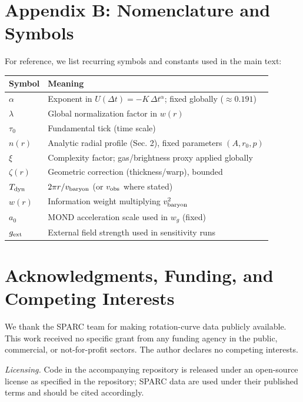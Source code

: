 \documentclass[12pt,a4paper]{article}
\begin{document}
\section*{Appendix B: Nomenclature and Symbols}
\noindent For reference, we list recurring symbols and constants used in the main text:
\begin{center}
\begin{tabular}{ll}
\toprule
Symbol & Meaning \\
\midrule
$\alpha$ & Exponent in $U(\Delta t)=-K\,\Delta t^{\alpha}$; fixed globally ($\approx0.191$) \\
$\lambda$ & Global normalization factor in $w(r)$ \\
$\tau_0$ & Fundamental tick (time scale) \\
$n(r)$ & Analytic radial profile (Sec. 2), fixed parameters $(A,r_0,p)$ \\
$\xi$ & Complexity factor; gas/brightness proxy applied globally \\
$\zeta(r)$ & Geometric correction (thickness/warp), bounded \\
$T_{\rm dyn}$ & $2\pi r/v_{\rm baryon}$ (or $v_{\rm obs}$ where stated) \\
$w(r)$ & Information weight multiplying $v_{\rm baryon}^2$ \\
$a_0$ & MOND acceleration scale used in $w_g$ (fixed) \\
$g_{\rm ext}$ & External field strength used in sensitivity runs \\
\bottomrule
\end{tabular}
\end{center}

\section*{Acknowledgments, Funding, and Competing Interests}
\noindent We thank the SPARC team for making rotation-curve data publicly available. This work received no specific grant from any funding agency in the public, commercial, or not-for-profit sectors. The author declares no competing interests.

\noindent \textit{Licensing.} Code in the accompanying repository is released under an open-source license as specified in the repository; SPARC data are used under their published terms and should be cited accordingly.
\end{document}
